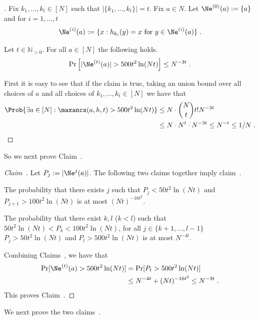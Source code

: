 \begin{proof}[]
 Fix $k_1,\ldots,k_t\in [N]$ such that $|\{k_1,\ldots,k_t\}|=t$. Fix $a\in N$.
    Let $\Ne^{(0)}(a):=\{a\}$ and for $i=1,\ldots,t$
    \[
    \Ne^{(i)}(a):=\{x: h_{k_i}(y)=x\text{ for }y\in \Ne^{(i)}(a)  \}\;.    
    \]
    \begin{myclaim}\label{claim:mw}
    Let $t\in \mathbb{N}_{>0}$. For all $a\in [N]$ the following holds.
    \[
    \Pr\left[|\Ne^{(t)}(a)|> 500t^2 \ln(Nt)\right]\leq N^{-3t} \;.    
    \]
    \end{myclaim}
    First it is easy to see that if the claim is true, taking an union bound over all choices of $a$ and all choices of $k_1,\ldots,k_t\in [N]$ we have that
    \begin{align*}
        \Prob{\exists a\in [N]:\maxancs(a,h,t)>500t^2\ln (Nt)}&\leq  N\cdot \binom{N}{t}t!N^{-3t}\\
        &\leq  N\cdot N^t\cdot N^{-3t}\leq N^{-t}\leq 1/N\;.   
    \end{align*}
\end{proof}
    So we next prove Claim~.
    \begin{proof} [Claim~]
    Let $P_j:=|\Ne^{{j}}(a)|$. The following two claims together imply claim~.
    \begin{myclaim}\label{claim:one}
        The probability that there exists $j$ such that $P_{j}<50 t^2\ln (Nt)$ and $P_{j+1}>100 t^2\ln (Nt)$ is at most $(Nt)^{-16t^2}$.  
    \end{myclaim}
    \begin{myclaim}\label{claim:two}
        The probability that there exist $k,l$ ($k<l$) such that $50t^2\ln (Nt)<P_k<100 t^2\ln (Nt)$, for all $j\in \{k+1,\ldots,l-1\}$ $P_{j}>50t^2\ln (Nt)$  and $P_{l}>500 t^2\ln (Nt)$ is at most $N^{-4t}$.
    \end{myclaim}
    Combining Claims~, we have that
    \begin{align*}
    \Pr[\Ne^{(t)}(a)>500t^2 \ln (Nt)]& =    \Pr[P_t>500t^2 \ln (Nt)]\\& \leq N^{-4t}+(Nt)^{-16t^2}\leq N^{-3t}\;.
    \end{align*}
    This proves Claim~.
\end{proof}
We next prove the two claims~.
